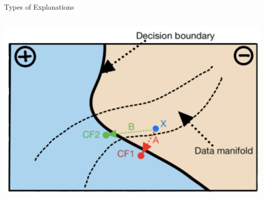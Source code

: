 \documentclass[11pt,compress,t,notes=noshow, aspectratio=169, xcolor=table]{beamer}
\begin{document}
\begin{frame}{Types of Explanations}
{\begin{columns}[c, totalwidth=\textwidth]
\begin{column}{0.3\linewidth}
        \centering \includegraphics[page=1, width=\textwidth]{figure/counterfactuals_obj}
    \end{column}
	\end{columns}}
	
\end{frame}





\end{document}
